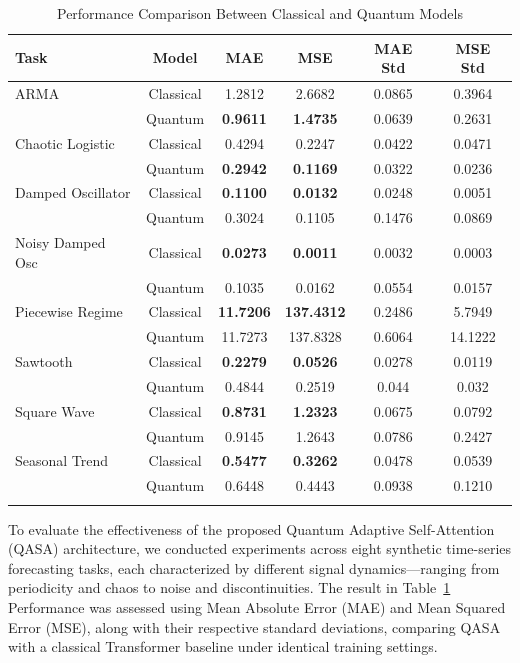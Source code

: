 \documentclass[conference]{IEEEtran}
\begin{document}
\begin{table}[h]
\centering
\caption{Performance Comparison Between Classical and Quantum Models}
\begin{tabular}{lccccc}
\toprule
\textbf{Task} & \textbf{Model} & \textbf{MAE} & \textbf{MSE} & \textbf{MAE Std} & \textbf{MSE Std} \\
\midrule
ARMA & Classical & 1.2812 & 2.6682 & 0.0865 & 0.3964 \\
  & Quantum   & \textbf{0.9611} & \textbf{1.4735} & 0.0639 & 0.2631 \\
\midrule
Chaotic Logistic & Classical & 0.4294 & 0.2247 & 0.0422 & 0.0471 \\
  & Quantum   & \textbf{0.2942} & \textbf{0.1169} & 0.0322 & 0.0236 \\
\midrule
Damped Oscillator & Classical & \textbf{0.1100} & \textbf{0.0132} & 0.0248 & 0.0051 \\
  & Quantum   & 0.3024 & 0.1105 & 0.1476 & 0.0869 \\
\midrule
Noisy Damped Osc & Classical & \textbf{0.0273} & \textbf{0.0011} & 0.0032 & 0.0003 \\
  & Quantum & 0.1035 & 0.0162 & 0.0554 & 0.0157 \\
\midrule
Piecewise Regime & Classical & \textbf{11.7206} & \textbf{137.4312} & 0.2486 & 5.7949 \\
  & Quantum   & 11.7273 & 137.8328 & 0.6064 & 14.1222 \\
\midrule
Sawtooth & Classical & \textbf{0.2279} & \textbf{0.0526} & 0.0278 & 0.0119 \\
  & Quantum   & 0.4844 & 0.2519 & 0.044 & 0.032 \\
\midrule
Square Wave & Classical & \textbf{0.8731} & \textbf{1.2323} & 0.0675 & 0.0792\\
  & Quantum   & 0.9145 & 1.2643 & 0.0786 & 0.2427 \\
\midrule
Seasonal Trend & Classical & \textbf{0.5477} & \textbf{0.3262} & 0.0478 & 0.0539 \\
  & Quantum   & 0.6448 & 0.4443 & 0.0938 & 0.1210 \\
\bottomrule
\label{tab:ts_mae_mse}
\end{tabular}
\end{table}

To evaluate the effectiveness of the proposed Quantum Adaptive Self-Attention (QASA) architecture, we conducted experiments across eight synthetic time-series forecasting tasks, each characterized by different signal dynamics—ranging from periodicity and chaos to noise and discontinuities. The result in Table~\ref{tab:ts_mae_mse} Performance was assessed using Mean Absolute Error (MAE) and Mean Squared Error (MSE), along with their respective standard deviations, comparing QASA with a classical Transformer baseline under identical training settings.
\end{document}
